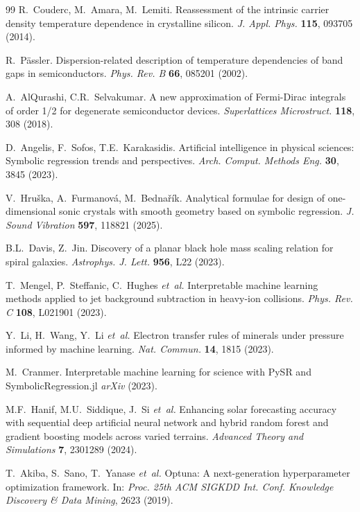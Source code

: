 \documentclass[fleqn,twoside,twocolumn,nofootinbib,showkeys]{revtex4} %
\begin{document}
\begin{thebibliography}{99}
R.~Couderc, M.~Amara, M.~Lemiti.
Reassessment of the intrinsic carrier density temperature dependence in crystalline silicon.
\textit{J. Appl. Phys.} \textbf{115}, 093705 (2014).

R.~P\"assler. Dispersion-related description of temperature dependencies of band gaps in semiconductors.
\textit{Phys. Rev. B} \textbf{66}, 085201 (2002).

A.~AlQurashi, C.R.~Selvakumar.
A new approximation of Fermi-Dirac integrals of order 1/2 for degenerate semiconductor devices.
\textit{Superlattices Microstruct.} \textbf{118}, 308 (2018).

D.~Angelis, F.~Sofos, T.E.~Karakasidis.
Artificial intelligence in physical sciences: Symbolic regression trends and perspectives.
\textit{Arch. Comput. Methods Eng.} \textbf{30}, 3845 (2023).

V.~Hruška, A.~Furmanová, M.~Bednařík.
Analytical formulae for design of one-dimensional sonic crystals with smooth geometry based on symbolic regression.
\textit{J. Sound Vibration} \textbf{597}, 118821 (2025).

B.L.~Davis, Z.~Jin.
Discovery of a planar black hole mass scaling relation for spiral galaxies.
\textit{Astrophys. J. Lett.} \textbf{956}, L22 (2023).

T.~Mengel, P.~Steffanic, C.~Hughes {\it et~al.}
Interpretable machine learning methods applied to jet background subtraction in heavy-ion collisions.
\textit{Phys. Rev. C} \textbf{108}, L021901 (2023).

Y.~Li, H.~Wang, Y.~Li {\it et~al.}
Electron transfer rules of minerals under pressure informed by machine learning.
\textit{Nat. Commun.} \textbf{14}, 1815 (2023).

M.~Cranmer. Interpretable machine learning for science with PySR and SymbolicRegression.jl 
\textit{arXiv} (2023).

M.F.~Hanif, M.U.~Siddique, J.~Si {\it et~al.}
Enhancing solar forecasting accuracy with sequential deep artificial neural network and hybrid random forest and gradient boosting models across varied terrains.
\textit{Advanced Theory and Simulations} \textbf{7}, 2301289 (2024).

T.~Akiba, S.~Sano, T.~Yanase {\it et~al.}
Optuna: A next-generation hyperparameter optimization framework.
In: \textit{Proc. 25th ACM SIGKDD Int. Conf. Knowledge Discovery \& Data Mining}, 2623 (2019).


\end{thebibliography}
\end{document}
